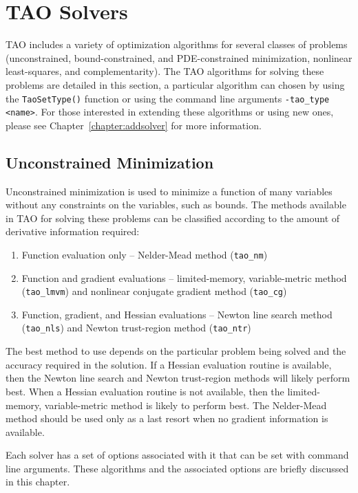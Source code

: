 
\chapter{TAO Solvers}
TAO includes a variety of optimization algorithms for several
classes of problems (unconstrained, bound-constrained,
and PDE-constrained minimization, nonlinear least-squares, and complementarity).
The TAO algorithms for solving these problems are detailed in this section, 
a particular algorithm can chosen by using the \texttt{TaoSetType()} function
or using the command line arguments \texttt{-tao\_type <name>}.
For those interested in extending these algorithms or using new ones, 
please see Chapter~\ref{chapter:addsolver} for more information.


\section{Unconstrained Minimization}
\label{chapter:unconstrained}
Unconstrained minimization is used to minimize a function of many variables
without any constraints on the variables, such as bounds.  The methods 
available in TAO for solving these problems can be classified according
to the amount of derivative information required:
\begin{enumerate}
\item Function evaluation only -- Nelder-Mead method ({\tt tao\_nm})
\item Function and gradient evaluations -- limited-memory, variable-metric 
method ({\tt tao\_lmvm}) and nonlinear conjugate gradient method 
({\tt tao\_cg})
\item Function, gradient, and Hessian evaluations -- Newton line search 
method ({\tt tao\_nls}) and Newton trust-region method ({\tt tao\_ntr})
\end{enumerate}
The best method to use depends on the particular problem being solved
and the accuracy required in the solution.  If a Hessian evaluation 
routine is available, then the Newton line search and Newton trust-region 
methods will likely perform best.  When a Hessian evaluation routine
is not available, then the limited-memory, variable-metric method is 
likely to perform best.  The Nelder-Mead method should be used only
as a last resort when no gradient information is available.

Each solver has a set of options associated with it that can be set with 
command line arguments.  These algorithms and the 
associated options are briefly discussed in this chapter.

